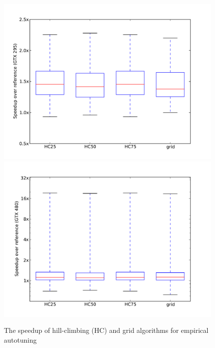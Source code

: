\begin{figure}
\centering
\includegraphics[scale=.42]{fig_genX_vader_295.pdf}
\includegraphics[scale=.42]{fig_genX_munctional0_480.pdf}
\caption{The speedup of hill-climbing (HC) and grid algorithms for empirical autotuning}
\label{fig:speedup}
\end{figure}

